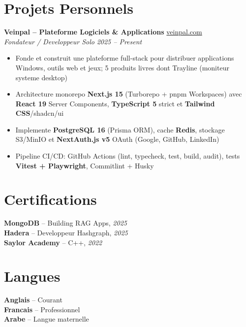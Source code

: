 \documentclass[10pt,a4paper]{article}
\begin{document}
\vspace{4pt}
\section*{Projets Personnels}
{\small
\textbf{Veinpal -- Plateforme Logiciels \& Applications} \hfill \href{https://veinpal.com}{veinpal.com}\\[1pt]
\textit{Fondateur / Developpeur Solo} \hfill \textit{2025 -- Present}
\begin{itemize}
  \item Fonde et construit une plateforme full-stack pour distribuer applications Windows, outils web et jeux; 5 produits livres dont Trayline (moniteur systeme desktop)
  \item Architecture monorepo \textbf{Next.js 15} (Turborepo + pnpm Workspaces) avec \textbf{React 19} Server Components, \textbf{TypeScript 5} strict et \textbf{Tailwind CSS}/shadcn/ui
  \item Implemente \textbf{PostgreSQL 16} (Prisma ORM), cache \textbf{Redis}, stockage S3/MinIO et \textbf{NextAuth.js v5} OAuth (Google, GitHub, LinkedIn)
  \item Pipeline CI/CD: GitHub Actions (lint, typecheck, test, build, audit), tests \textbf{Vitest + Playwright}, Commitlint + Husky
\end{itemize}


}

\vspace{3pt}
\section*{Certifications}
{\small
\textbf{MongoDB} -- Building RAG Apps, \textit{2025}\\[1pt]
\textbf{Hadera} -- Developpeur Hashgraph, \textit{2025}\\[1pt]
\textbf{Saylor Academy} -- C++, \textit{2022}
}

\section*{Langues}
{\small
\textbf{Anglais} -- Courant\\[1pt]
\textbf{Francais} -- Professionnel\\[1pt]
\textbf{Arabe} -- Langue maternelle
}
\end{document}
